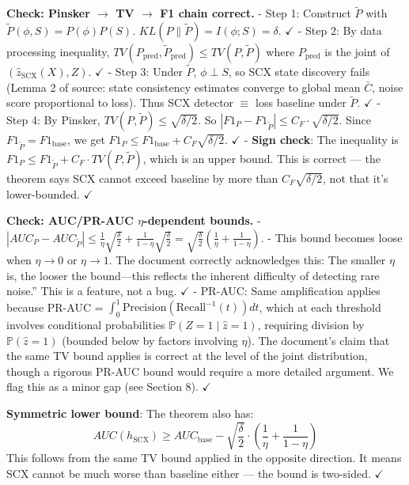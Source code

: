 \documentclass[
  12pt,
]{ctexart}
\begin{document}
\textbf{Check: Pinsker \(\to\) TV \(\to\) F1 chain correct.} - Step 1:
Construct \(\tilde{P}\) with \(\tilde{P}(\phi, S) = P(\phi)P(S)\).
\(KL(P\|\tilde{P}) = I(\phi; S) = \delta\). \(\checkmark\) - Step 2: By
data processing inequality,
\(TV(P_{\text{pred}}, \tilde{P}_{\text{pred}}) \leq TV(P, \tilde{P})\)
where \(P_{\text{pred}}\) is the joint of
\((\hat{z}_{\text{SCX}}(X), Z)\). \(\checkmark\) - Step 3: Under
\(\tilde{P}\), \(\phi \perp S\), so SCX state discovery fails (Lemma 2
of source: state consistency estimates converge to global mean
\(\bar{C}\), noise score proportional to loss). Thus SCX detector
\(\equiv\) loss baseline under \(\tilde{P}\). \(\checkmark\) - Step 4:
By Pinsker, \(TV(P, \tilde{P}) \leq \sqrt{\delta/2}\). So
\(|F1_P - F1_{\tilde{P}}| \leq C_F \cdot \sqrt{\delta/2}\). Since
\(F1_{\tilde{P}} = F1_{\text{base}}\), we get
\(F1_P \leq F1_{\text{base}} + C_F\sqrt{\delta/2}\). \(\checkmark\) -
\textbf{Sign check}: The inequality is
\(F1_P \leq F1_{\tilde{P}} + C_F \cdot TV(P, \tilde{P})\), which is an
upper bound. This is correct --- the theorem says SCX cannot exceed
baseline by more than \(C_F\sqrt{\delta/2}\), not that it's
lower-bounded. \(\checkmark\)

\textbf{Check: AUC/PR-AUC \(\eta\)-dependent bounds.} -
\(|AUC_P - AUC_{\tilde{P}}| \leq \frac{1}{\eta}\sqrt{\frac{\delta}{2}} + \frac{1}{1-\eta}\sqrt{\frac{\delta}{2}} = \sqrt{\frac{\delta}{2}}(\frac{1}{\eta} + \frac{1}{1-\eta})\).
- This bound becomes loose when \(\eta \to 0\) or \(\eta \to 1\). The
document correctly acknowledges this:
The smaller \(\eta\) is, the looser the bound---this reflects the inherent difficulty of detecting rare noise.'' This is
a feature, not a bug. \(\checkmark\) - PR-AUC: Same amplification
applies because PR-AUC =
\(\int_0^1 \text{Precision}(\text{Recall}^{-1}(t)) dt\), which at each
threshold involves conditional probabilities
\(\mathbb{P}(Z=1 \mid \hat{z}=1)\), requiring division by
\(\mathbb{P}(\hat{z}=1)\) (bounded below by factors involving \(\eta\)).
The document's claim that the same TV bound applies is correct at the
level of the joint distribution, though a rigorous PR-AUC bound would
require a more detailed argument. We flag this as a minor gap (see
Section 8). \(\checkmark\)

\textbf{Symmetric lower bound}: The theorem also has:
\[AUC(h_{\text{SCX}}) \geq AUC_{\text{base}} - \sqrt{\frac{\delta}{2}} \cdot \left(\frac{1}{\eta} + \frac{1}{1-\eta}\right)\]
This follows from the same TV bound applied in the opposite direction.
It means SCX cannot be much worse than baseline either --- the bound is
two-sided. \(\checkmark\)
\end{document}
